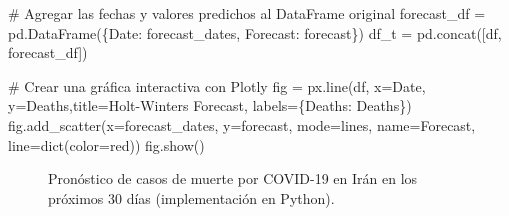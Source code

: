 \documentclass[
  us-letterpaper,
]{scrreprt}
\newenvironment{Shaded}{\begin{snugshade}}{\end{snugshade}}
\newcommand{\BuiltInTok}[1]{\textcolor[rgb]{0.00,0.23,0.31}{#1}}
\newcommand{\CommentTok}[1]{\textcolor[rgb]{0.37,0.37,0.37}{#1}}
\newcommand{\NormalTok}[1]{\textcolor[rgb]{0.00,0.23,0.31}{#1}}
\newcommand{\OperatorTok}[1]{\textcolor[rgb]{0.37,0.37,0.37}{#1}}
\newcommand{\StringTok}[1]{\textcolor[rgb]{0.13,0.47,0.30}{#1}}
\theoremstyle{plain}
\theoremstyle{definition}
\theoremstyle{definition}
\theoremstyle{plain}
\theoremstyle{remark}
\begin{document}
\begin{tcolorbox}
\begin{Shaded}
\begin{Highlighting}[]
\CommentTok{\# Agregar las fechas y valores predichos al DataFrame original}
\NormalTok{forecast\_df }\OperatorTok{=}\NormalTok{ pd.DataFrame(\{}\StringTok{\textquotesingle{}Date\textquotesingle{}}\NormalTok{: forecast\_dates, }
\StringTok{\textquotesingle{}Forecast\textquotesingle{}}\NormalTok{: forecast\})}
\NormalTok{df\_t }\OperatorTok{=}\NormalTok{ pd.concat([df, forecast\_df])}

\CommentTok{\# Crear una gráfica interactiva con Plotly}
\NormalTok{fig }\OperatorTok{=}\NormalTok{ px.line(df, x}\OperatorTok{=}\StringTok{\textquotesingle{}Date\textquotesingle{}}\NormalTok{, y}\OperatorTok{=}\StringTok{\textquotesingle{}Deaths\textquotesingle{}}\NormalTok{,title}\OperatorTok{=}\StringTok{\textquotesingle{}Holt{-}Winters Forecast\textquotesingle{}}\NormalTok{, }
\NormalTok{labels}\OperatorTok{=}\NormalTok{\{}\StringTok{\textquotesingle{}Deaths\textquotesingle{}}\NormalTok{: }\StringTok{\textquotesingle{}Deaths\textquotesingle{}}\NormalTok{\})}
\NormalTok{fig.add\_scatter(x}\OperatorTok{=}\NormalTok{forecast\_dates, y}\OperatorTok{=}\NormalTok{forecast, mode}\OperatorTok{=}\StringTok{\textquotesingle{}lines\textquotesingle{}}\NormalTok{, }
\NormalTok{name}\OperatorTok{=}\StringTok{\textquotesingle{}Forecast\textquotesingle{}}\NormalTok{, line}\OperatorTok{=}\BuiltInTok{dict}\NormalTok{(color}\OperatorTok{=}\StringTok{\textquotesingle{}red\textquotesingle{}}\NormalTok{))}
\NormalTok{fig.show()}
\end{Highlighting}
\end{Shaded}

\end{tcolorbox}

\begin{figure}


\caption{\label{fig-hwf1}Pronóstico de casos de muerte por COVID-19 en
Irán en los próximos 30 días (implementación en Python).}

\end{figure}%
\end{document}
